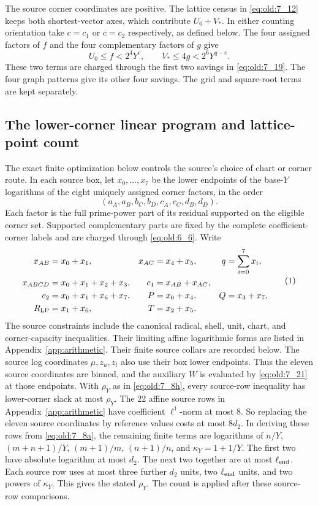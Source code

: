 The source corner coordinates are positive. The lattice census in
\eqref{eq:old:7_12} keeps both shortest-vector axes, which contribute
\(U_0+V_*\). In either counting orientation take \(c=c_1\) or
\(c=c_2\) respectively, as defined below. The four assigned factors of
\(f\) and the four complementary factors of \(g\) give
\[
 U_0\le f<2^4Y^c,\qquad V_*\le4g<2^6Y^{q-c}.
\]
These two terms are charged through the first two savings in
\eqref{eq:old:7_19}. The four graph patterns give its other four
savings. The grid and square-root terms are kept separately.

\subsection{The lower-corner linear program and lattice-point count}

The exact finite optimization below controls the source's choice of chart
or corner route. In each source box, let
\(x_0,\ldots,x_7\) be the lower endpoints of the base-\(Y\) logarithms
of the eight uniquely assigned corner factors, in the order
\[
 (a_A,a_B,b_C,b_D,c_A,c_C,d_B,d_D).
\]
Each factor is the full prime-power part of its residual supported on the
eligible corner set. Supported complementary parts are fixed by the complete
coefficient-corner labels and are charged through \eqref{eq:old:6_6}.
Write
\[
\begin{aligned}
x_{AB}&=x_0+x_1,& x_{AC}&=x_4+x_5,& q&=\sum_{i=0}^7x_i,\\
x_{ABCD}&=x_0+x_1+x_2+x_3,& c_1&=x_{AB}+x_{AC},\\
c_2&=x_0+x_1+x_6+x_7,&
P&=x_0+x_4,& Q&=x_3+x_7,\\
R_{\rm LP}&=x_1+x_6,& T&=x_2+x_5.
\end{aligned}
\AutoTag{eq:old:7_18}
\]
The source constraints include the canonical radical, shell, unit, chart,
and corner-capacity inequalities. Their limiting affine logarithmic forms
are listed in Appendix~\ref{app:arithmetic}. Their finite source collars
are recorded below. The source log coordinates
\(\mu,z_u,z_t\) also use their box lower endpoints. Thus the eleven
source coordinates are binned, and the auxiliary \(W\) is evaluated by
\eqref{eq:old:7_21} at those endpoints.
With \(\rho_Y\) as in \eqref{eq:old:7_8h}, every source-row inequality has
lower-corner slack at most
\(\rho_Y\). The 22 affine source rows in Appendix~\ref{app:arithmetic}
have coefficient \(\ell^1\)-norm at most \(8\). So replacing the
eleven source coordinates by reference values costs at most \(8d_2\).
In deriving these rows from \eqref{eq:old:7_8a}, the remaining finite terms
are logarithms of
\(n/Y\), \((m+n+1)/Y\), \((m+1)/m\), \((n+1)/n\), and
\(\kappa_Y=1+1/Y\). The first two have absolute logarithm at most
\(d_2\). The next two together are at most \(\ell_{\rm end}\). Each
source row uses at most three further \(d_2\) units, two
\(\ell_{\rm end}\) units, and two powers of \(\kappa_Y\). This gives the
stated \(\rho_Y\). The count is applied after these source-row comparisons.

